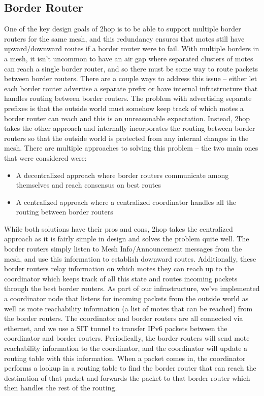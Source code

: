 \subsection{Border Router}
One of the key design goals of 2hop is to be able to support multiple border routers for the same mesh, and this redundancy ensures that motes still have upward/downward routes if a border router were to fail.
With multiple borders in a mesh, it isn't uncommon to have an air gap where separated clusters of motes can reach a single border router, and so there must be some way to route packets between border routers.
There are a couple ways to address this issue -- either let each border router advertise a separate prefix or have internal infrastructure that handles routing between border routers.
The problem with advertising separate prefixes is that the outside world must somehow keep track of which motes a border router can reach and this is an unreasonable expectation.
Instead, 2hop takes the other approach and internally incorporates the routing between border routers so that the outside world is protected from any internal changes in the mesh.
There are multiple approaches to solving this problem -- the two main ones that were considered were:
\begin{itemize}
\item A decentralized approach where border routers communicate among themselves and reach consensus on best routes
\item A centralized approach where a centralized coordinator handles all the routing between border routers 
\end{itemize}
While both solutions have their pros and cons, 2hop takes the centralized approach as it is fairly simple in design and solves the problem quite well.
The border routers simply listen to Mesh Info/Announcement messages from the mesh, and use this information to establish downward routes.
Additionally, these border routers relay information on which motes they can reach up to the coordinator which keeps track of all this state and routes incoming packets through the best border routers.
As part of our infrastructure, we've implemented a coordinator node that listens for incoming packets from the outside world as well as mote reachability information (a list of motes that can be reached) from the border routers. The coordinator and border routers are all connected via ethernet, and we use a SIT tunnel to transfer IPv6 packets between the coordinator and border routers. Periodically, the border routers will send mote reachability information to the coordinator, and the coordinator will update a routing table with this information. When a packet comes in, the coordinator performs a lookup in a routing table to find the border router that can reach the destination of that packet and forwards the packet to that border router which then handles the rest of the routing.

